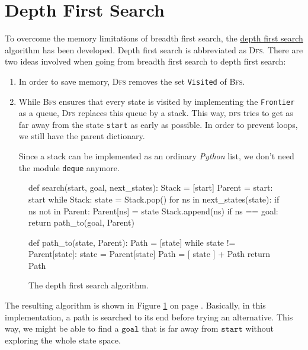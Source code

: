 \section{Depth First Search}
To overcome the memory limitations of breadth first search, the
\href{https://en.wikipedia.org/wiki/Depth-first_search}{depth first search} algorithm 
has been developed.  Depth first search is abbreviated as \textsc{Dfs}.  There are two ideas involved when going from
breadth first search to depth first search:
\begin{enumerate}
\item In order to save memory, \textsc{Dfs} removes the set \texttt{Visited} of \textsc{Bfs}.
\item While \textsc{Bfs} ensures that every state is visited by implementing the \texttt{Frontier} as a queue,
      \textsc{Dfs} replaces this queue by a stack.  This way, \textsc{dfs} tries to get as far away from the state
      \texttt{start} as early as possible.  In order to prevent loops, we still have the parent dictionary.

      Since a stack can be implemented as an ordinary \textsl{Python} list, we don't need the module
      \texttt{deque} anymore. 
\end{enumerate}

\begin{figure}[!ht]
\centering
\begin{python3code}
    def search(start, goal, next_states):
        Stack  = [start]
        Parent = { start: start }
        while Stack:
            state = Stack.pop()
            for ns in next_states(state):
                if ns not in Parent:
                    Parent[ns] = state
                    Stack.append(ns)
                    if ns == goal:
                        return path_to(goal, Parent)

    def path_to(state, Parent):
       Path = [state]
       while state != Parent[state]:
           state = Parent[state]
           Path  = [ state ] + Path
       return Path
\end{python3code}
\vspace*{-0.3cm}
\caption{The depth first search algorithm.}
\label{fig:Depth-First-Search-Stack.ipynb}
\end{figure}
\FloatBarrier

The resulting algorithm is shown in Figure
\ref{fig:Depth-First-Search-Stack.ipynb} on page \pageref{fig:Depth-First-Search-Stack.ipynb}.  Basically, in this
implementation, a path is searched to its end before trying an alternative.  This way, we might be able to find a
$\texttt{goal}$ that is far away from $\texttt{start}$ without exploring the whole state space.



